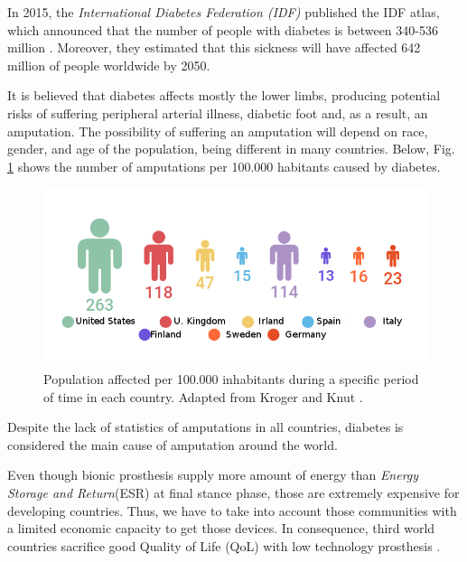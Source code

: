 \documentclass[12pt,english]{article}
\begin{document}
In 2015, the \emph{International Diabetes Federation (IDF)} published the IDF atlas, which announced that the number of people with diabetes is between 340-536 million \cite{IDF2015}. Moreover, they estimated that this sickness will have affected 642 million of people worldwide by 2050.
  
It is believed that diabetes affects mostly the lower limbs, producing potential risks of suffering peripheral arterial illness, diabetic foot and, as a result, an amputation. The possibility of suffering an amputation will depend on race, gender, and age of the population, being different in many countries. Below, Fig. \ref{fig:N=0000FAmero-de-amputaciones} shows the number of amputations per 100.000 habitants caused by diabetes.
\begin{figure}[H]
\begin{centering}
\includegraphics[scale=0.5]{ampperyear}
\par\end{centering}

\caption{\label{fig:N=0000FAmero-de-amputaciones}Population affected per 100.000 inhabitants during a specific period of time in each country. Adapted from Kroger and Knut \cite{KrogerKnut2015}.}

\end{figure}


Despite the lack of statistics of amputations in all countries, diabetes is considered the main cause of amputation around the world.

Even though bionic prosthesis supply more amount of energy than \emph{ Energy Storage and Return}(ESR) at final stance phase, those are extremely expensive for developing countries. Thus, we have to take into account those communities with a limited economic capacity to get those devices. In consequence, third world countries sacrifice good Quality of Life (QoL) with low technology prosthesis \cite{Lemoyne}.
\end{document}
